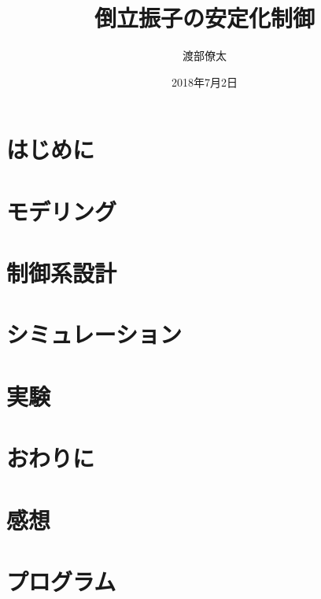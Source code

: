 \documentclass[a4j , 11pt , twoside]{jbook}
\begin{document}
\title{倒立振子の安定化制御}
\author{渡部僚太}
\date{2018年7月2日}
\maketitle
\tableofcontents %
\listoffigures %
\listoftables %
\cleardoublepage %
\chapter{はじめに}
	
\chapter{モデリング}
	
\chapter{制御系設計}  
	 
\chapter{シミュレーション}
	
\chapter{実験}
	
\chapter{おわりに}
	
\chapter{感想}
	



\appendix
\chapter{プログラム}
	
\end{document}
